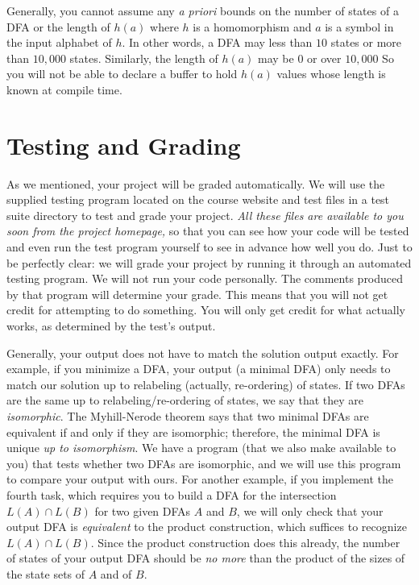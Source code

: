 \documentclass[11pt]{article}
\begin{document}
Generally, you cannot assume any \textit{a priori} bounds on the
number of states of a DFA or the length of $h(a)$ where $h$ is a
homomorphism and $a$ is a symbol in the input alphabet of $h$.  In
other words, a DFA may less than $10$ states or more than $10,000$
states.  Similarly, the length of $h(a)$ may be $0$ or over $10,000$
So you will not be able to declare a buffer to hold $h(a)$ values
whose length is known at compile time.

\section{Testing and Grading}

As we mentioned, your project will be graded automatically.  We will
use the supplied testing program located on the course website and
test files in a test suite directory to test and grade your project.
\emph{All these files are available to you soon from the project
homepage,} so that you can see how your code will be tested and even
run the test program yourself to see in advance how well you do.  Just
to be perfectly clear: we will grade your project by running it
through an automated testing program.  We will not run your code
personally.  The comments produced by that program will determine your
grade.  This means that you will not get credit for attempting to do
something.  You will only get credit for what actually works, as
determined by the test's output.

Generally, your output does not have to match the solution output
exactly.  For example, if you minimize a DFA, your output (a minimal
DFA) only needs to match our solution up to relabeling (actually,
re-ordering) of states.  If two DFAs are the same up to
relabeling/re-ordering of states, we say that they are
\emph{isomorphic}.  The Myhill-Nerode theorem says that two minimal
DFAs are equivalent if and only if they are isomorphic; therefore, the
minimal DFA is unique \emph{up to isomorphism}.  We have a program
(that we also make available to you) that tests whether two DFAs are
isomorphic, and we will use this program to compare your output with
ours.  For another example, if you implement the fourth task, which
requires you to build a DFA for the intersection $L(A)\cap L(B)$ for
two given DFAs $A$ and $B$, we will only check that your output DFA is
\emph{equivalent} to the product construction, which suffices to
recognize $L(A)\cap L(B)$.  Since the product construction does this
already, the number of states of your output DFA should be \emph{no
more} than the product of the sizes of the state sets of $A$ and of
$B$.
\end{document}
